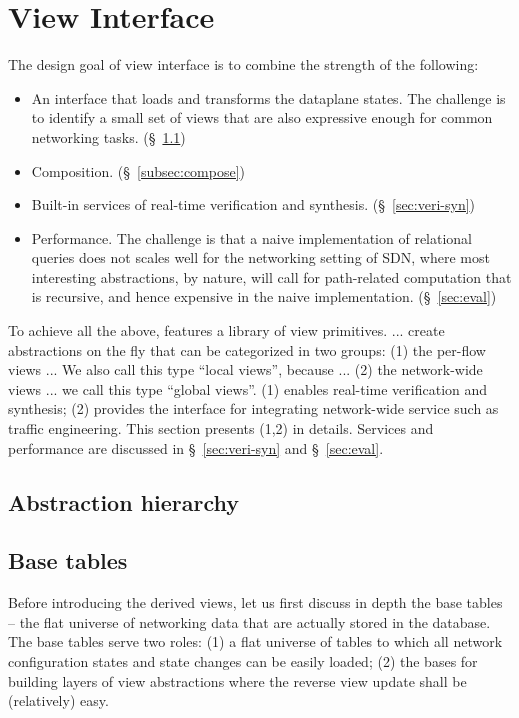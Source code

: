 \section{View Interface}
\label{sec:details}

The design goal of \Sys view interface is to combine the strength of
the following:
\begin{itemize}
\item An interface that loads and transforms the dataplane states.
  The challenge is to
  identify a small set of views that are also expressive enough for
  common networking tasks. (\S~\ref{subsec:view-library})
\item Composition. (\S~\ref{subsec:compose})
\item Built-in services of real-time verification and
  synthesis. (\S~\ref{sec:veri-syn})
\item Performance. The challenge is that a naive implementation of
  relational queries does not scales well for the networking setting
  of SDN, where most interesting abstractions, by nature, will call
  for path-related computation that is recursive, and hence expensive
  in the naive implementation. (\S~\ref{sec:eval})
\end{itemize}

To achieve all the above, \Sys features a library of view primitives.
... create abstractions on the fly that can be categorized in two
groups: (1) the per-flow views ... We also call this type ``local
views'', because ... (2) the network-wide views ... we call this type
``global views''.  (1) enables real-time verification and synthesis;
(2) provides the interface for integrating network-wide service such
as traffic engineering.  This section presents (1,2) in
details. Services and performance are discussed in
\S~\ref{sec:veri-syn} and \S~\ref{sec:eval}.

\subsection{Abstraction hierarchy}

\label{subsec:view-library}

\subsection{Base tables}

Before introducing the derived views, let us first discuss in depth
the base tables -- the flat universe of networking data that are
actually stored in the database. The base tables serve two roles: (1)
a flat universe of tables to which all network configuration states
and state changes can be easily loaded; (2) the bases for building
layers of view abstractions where the reverse view update shall be
(relatively) easy.

